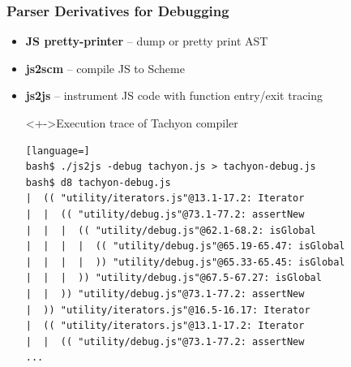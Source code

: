 \begin{frame}[fragile]
\frametitle{\bf Parser Derivatives for Debugging}

  \begin{itemize}

  \item {\bf JS pretty-printer} -- dump or pretty print AST
    \smallskip

  \item {\bf js2scm} -- compile JS to Scheme
    \smallskip

  \item {\bf js2js} -- instrument JS code with function entry/exit tracing
    \smallskip

\begin{block}<+->{Execution trace of Tachyon compiler}
\begin{lstlisting}[language=]
bash$ ./js2js -debug tachyon.js > tachyon-debug.js
bash$ d8 tachyon-debug.js
|  (( "utility/iterators.js"@13.1-17.2: Iterator
|  |  (( "utility/debug.js"@73.1-77.2: assertNew
|  |  |  (( "utility/debug.js"@62.1-68.2: isGlobal
|  |  |  |  (( "utility/debug.js"@65.19-65.47: isGlobal
|  |  |  |  )) "utility/debug.js"@65.33-65.45: isGlobal
|  |  |  )) "utility/debug.js"@67.5-67.27: isGlobal
|  |  )) "utility/debug.js"@73.1-77.2: assertNew
|  )) "utility/iterators.js"@16.5-16.17: Iterator
|  (( "utility/iterators.js"@13.1-17.2: Iterator
|  |  (( "utility/debug.js"@73.1-77.2: assertNew
...
\end{lstlisting}
\end{block}

  \end{itemize}

\end{frame}


